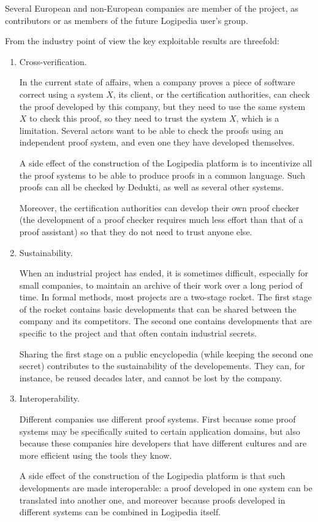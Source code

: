 Several European and non-European companies are member of the project,
as contributors or as members of the future {\sc Logipedia} user's group.

From the industry point of view the key exploitable results are threefold:

\begin{enumerate}
\item Cross-verification.

In the current state of affairs, when a company proves a piece of
software correct using a system $X$, its client, or the certification
authorities, can check the proof developed by this company, but they
need to use the same system $X$ to check this proof, so they need to
trust the system $X$, which is a limitation. Several actors want to be
able to check the proofs using an independent proof system, and even one
they have developed themselves.

A side effect of the construction of the {\sc Logipedia} platform is
to incentivize all the proof systems to be able to produce proofs in a
common language. Such proofs can all be checked by {\sc
Dedukti}, as well as several other systems.

Moreover, the certification authorities can develop their own
proof checker (the development of a proof checker requires much less effort than
that of a proof assistant)
so that they do not need to trust anyone else.

\item Sustainability.

When an industrial project has ended, it is sometimes difficult,
especially for small companies, to maintain an archive of their work over
a long period of time. In formal methods, most projects are a
two-stage rocket. The first stage of the rocket contains basic
developments that can be shared between the company and its
competitors. The second one contains developments that are specific to the
project and that often contain industrial secrets.

Sharing the first stage on a public encyclopedia (while keeping the
second one secret) contributes to the sustainability of the
developements. They can, for instance, be reused decades later, and
cannot be lost by the company.

\item Interoperability.

Different companies use different proof systems. First because some proof
systems may be specifically suited to certain application domains,
but also because these companies hire developers
that have different cultures and are more efficient using the
tools they know.

A side effect of the construction of the {\sc Logipedia} platform is
that such developments are made interoperable: a proof
developed in one system can be translated into another one, and moreover
because proofs developed in different systems can be combined in {\sc
Logipedia} itself.
\end{enumerate}

